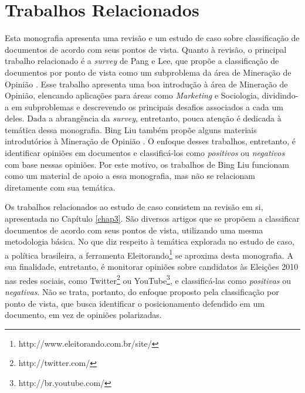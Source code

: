 \section{Trabalhos Relacionados}
\label{relacionados}

Esta monografia apresenta uma revisão e um estudo de caso sobre classificação de documentos de acordo com seus pontos de vista. Quanto à revisão, o principal trabalho relacionado é a \emph{survey} de Pang e Lee, que propõe a classificação de documentos por ponto de vista como um subproblema da área de Mineração de Opinião \cite{omsa}. Esse trabalho apresenta uma boa introdução à área de Mineração de Opinião, elencando aplicações para áreas como \emph{Marketing} e Sociologia,  dividindo-a em subproblemas e descrevendo os principais desafios associados a cada um deles. Dada a abrangência da \emph{survey}, entretanto, pouca atenção é dedicada à temática dessa monografia. Bing Liu também propõe alguns materiais introdutórios à Mineração de Opinião \cite{bingliu, handbook-liu}. O enfoque desses trabalhos, entretanto, é identificar opiniões em documentos e classificá-los como \emph{positivos} ou \emph{negativos} com base nessas opiniões. Por este motivo, os trabalhos de Bing Liu funcionam como um material de apoio a essa monografia, mas não se relacionam diretamente com sua temática. %
 


Os trabalhos relacionados ao estudo de caso consistem na revisão em si, apresentada no Capítulo \ref{chap3}. São diversos artigos que se propõem a classificar documentos de acordo com seus pontos de vista, utilizando uma mesma metodologia básica. No que diz respeito à temática explorada no estudo de caso, a política brasileira, a ferramenta Eleitorando\footnote{http://www.eleitorando.com.br/site/} se aproxima desta monografia. A sua finalidade, entretanto, é monitorar opiniões sobre candidatos às Eleições 2010 nas redes sociais, como Twitter\footnote{http://twitter.com/} ou YouTube\footnote{http://br.youtube.com/}, e classificá-las como \emph{positivas} ou \emph{negativas}. Não se trata, portanto, do enfoque proposto pela classificação por ponto de vista, que busca identificar o posicionamento defendido em um documento, em vez de opiniões polarizadas.



